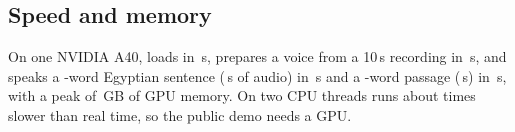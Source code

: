 \subsection{Speed and memory}
On one NVIDIA A40, \BA loads in \,s, prepares a voice from a 10\,s recording in \,s, and
speaks a -word Egyptian sentence (\,s of audio) in \,s and a
-word passage (\,s) in \,s, with a peak of
\,GB of GPU memory. On two CPU threads \vox runs about  times slower than real
time, so the public demo needs a GPU.
